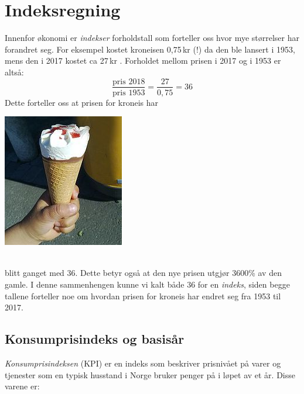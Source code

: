 




\newpage
\section{Indeksregning}
\parbox{0.6\linewidth}{Innenfor økonomi er \textit{indekser} forholdstall som forteller oss hvor mye størrelser har forandret seg. For eksempel kostet kroneisen 0,75\,kr (!) da den ble lansert i 1953, mens den i 2017 kostet ca 27\,kr . Forholdet mellom prisen i 2017 og i 1953 er altså:
	\[ \frac{\text{pris 2018}}{\text{pris 1953}}=\frac{27}{0,75}= 36 \]
Dette forteller oss at prisen for kroneis har
}
\parbox[r]{0.3\linewidth}{\includegraphics[scale=2]{kr}}\\[2pt]
blitt ganget med 36. Dette betyr også at den nye prisen utgjør 3600\% av den gamle. I denne sammenhengen kunne vi kalt både 36 for en \textit{indeks}, siden begge tallene forteller noe om hvordan prisen for kroneis har endret seg fra 1953 til 2017.

\subsection{Konsumprisindeks og basisår}
\textit{Konsumprisindeksen} (KPI) er en indeks som beskriver prisnivået på varer og tjenester som en typisk husstand i Norge bruker penger på i løpet av et år. Disse varene er:

